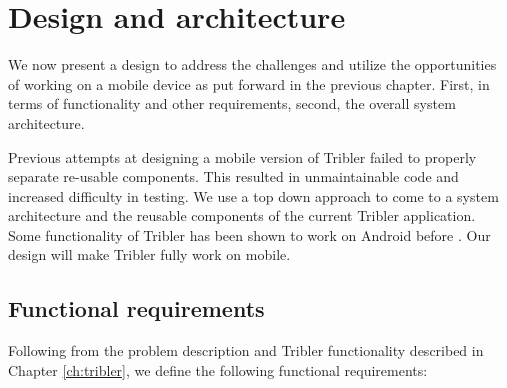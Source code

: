 \chapter{Design and architecture}\label{ch:design}

We now present a design to address the challenges and utilize the opportunities of working on a mobile device as put forward in the previous chapter.
First, in terms of functionality and other requirements, second, the overall system architecture.

Previous attempts at designing a mobile version of Tribler failed to properly separate re-usable components.
This resulted in unmaintainable code and increased difficulty in testing.
We use a top down approach to come to a system architecture and the reusable components of the current Tribler application.
Some functionality of Tribler has been shown to work on Android before \cite{tribler2014play,tribler2014at3,tribler-anon-hd}.
Our design will make Tribler fully work on mobile.


\section{Functional requirements}\label{sec:func_req}

Following from the problem description and Tribler functionality described in Chapter \ref{ch:tribler}, we define the following functional requirements:


